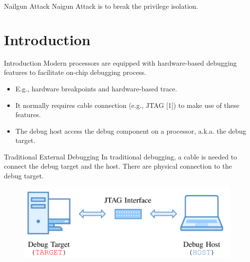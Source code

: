 \documentclass{beamer}
\begin{document}
\begin{frame}{Nailgun Attack}
    Naigun Attack is to break the privilege isolation.
\end{frame}

\section{Introduction}

\begin{frame}{Introduction}
    Modern processors are equipped with hardware-based debugging features to facilitate on-chip debugging process.
    \begin{itemize}
        \item E.g., hardware breakpoints and hardware-based trace.
        \item It normally requires cable connection (e.g., JTAG [1]) to make use of these features.
        \item The debug host access the debug component on a processor, a.k.a. the debug target.
    \end{itemize}
\end{frame}

\begin{frame}{Traditional External Debugging}
    In traditional debugging, a cable is needed to connect the debug target and the host. There are physical connection to the debug target.
    \begin{figure}
        \centering
        \includegraphics[scale=.40]{SUSTech-Beamer-Theme/pic/externel_debug.png}
        \label{fig:my_label}
    \end{figure}
\end{frame}
\end{document}
